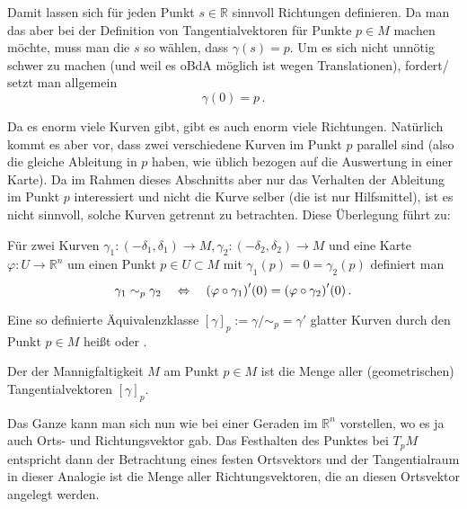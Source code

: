 \documentclass[../H_Analysis_main.tex]{subfiles}
\begin{document}
Damit lassen sich für jeden Punkt $s \in \mathbb{R}$ sinnvoll Richtungen definieren. Da man das aber bei der Definition von Tangentialvektoren für Punkte $p \in M$ machen möchte, muss man die $s$ so wählen, dass $\gamma(s) = p$. Um es sich nicht unnötig schwer zu machen (und weil es oBdA möglich ist wegen Translationen), fordert/ setzt man allgemein
\begin{equation}
\gamma(0) = p \, .
\end{equation}

Da es enorm viele Kurven gibt, gibt es auch enorm viele Richtungen. Natürlich kommt es aber vor, dass zwei verschiedene Kurven im Punkt $p$ parallel sind (also die gleiche Ableitung in $p$ haben, wie üblich bezogen auf die Auswertung in einer Karte). Da im Rahmen dieses Abschnitts aber nur das Verhalten der Ableitung im Punkt $p$ interessiert und nicht die Kurve selber (die ist nur Hilfsmittel), ist es nicht sinnvoll, solche Kurven getrennt zu betrachten. Diese Überlegung führt zu:

\begin{defi}
Für zwei Kurven $\gamma_1: (-\delta_1, \delta_1) \rightarrow M, \gamma_2: (-\delta_2, \delta_2) \rightarrow M$ und eine Karte $\varphi: U \rightarrow \mathbb{R}^n$ um einen Punkt $p \in U \subset M$ mit $\gamma_1(p) = 0 = \gamma_2(p)$ definiert man
\begin{equation}\label{eq:aequ_rel_vektoren}
\gamma_1 \sim_p \gamma_2 \quad \Leftrightarrow \quad \qty(\varphi \circ \gamma_1)'(0) = \qty(\varphi \circ \gamma_2)'(0) \, .
\end{equation}

Eine so definierte Äquivalenzklasse $[\gamma]_p := \gamma/ \sim_p = \gamma'$ glatter Kurven durch den Punkt $p \in M$ heißt  oder .

Der  der Mannigfaltigkeit $M$ am Punkt $p \in M$ ist die Menge aller (geometrischen) Tangentialvektoren  $[\gamma]_p$.
\end{defi}

Das Ganze kann man sich nun wie bei einer Geraden im $\mathbb{R}^n$ vorstellen, wo es ja auch Orts- und Richtungsvektor gab. Das Festhalten des Punktes bei $T_p M$ entspricht dann der Betrachtung eines festen Ortsvektors und der Tangentialraum in dieser Analogie ist die Menge aller Richtungsvektoren, die an diesen Ortsvektor angelegt werden.
\end{document}

